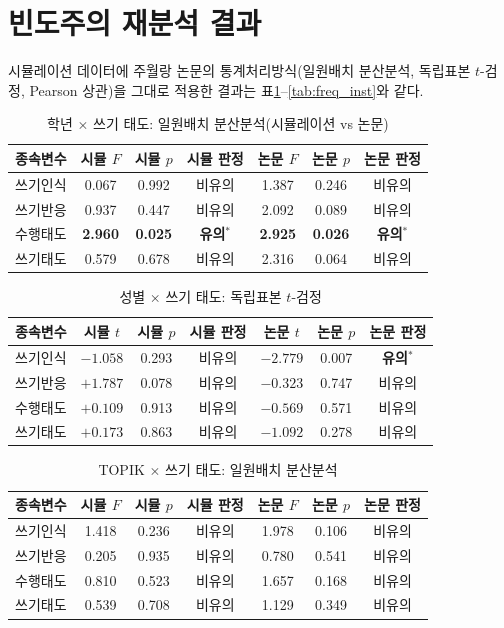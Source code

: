 \documentclass[11pt]{article}
\begin{document}
\section{빈도주의 재분석 결과}
\label{sec:freq}

시뮬레이션 데이터에 주월랑 논문의 통계처리방식(일원배치 분산분석, 독립표본 $t$-검정, Pearson 상관)을 그대로 적용한 결과는 표\ref{tab:freq_anova}--\ref{tab:freq_inst}와 같다.

\begin{table}[h]
\centering
\caption{학년 $\times$ 쓰기 태도: 일원배치 분산분석(시뮬레이션 vs 논문)}\label{tab:freq_anova}
\begin{tabular}{lcccccc}
\toprule
종속변수 & 시뮬 $F$ & 시뮬 $p$ & 시뮬 판정 & 논문 $F$ & 논문 $p$ & 논문 판정 \\
\midrule
쓰기인식 & 0.067 & 0.992 & 비유의 & 1.387 & 0.246 & 비유의 \\
쓰기반응 & 0.937 & 0.447 & 비유의 & 2.092 & 0.089 & 비유의 \\
수행태도 & \textbf{2.960} & \textbf{0.025} & \textbf{유의$^*$} & \textbf{2.925} & \textbf{0.026} & \textbf{유의$^*$} \\
쓰기태도 & 0.579 & 0.678 & 비유의 & 2.316 & 0.064 & 비유의 \\
\bottomrule
\end{tabular}
\end{table}

\begin{table}[h]
\centering
\caption{성별 $\times$ 쓰기 태도: 독립표본 $t$-검정}\label{tab:freq_tgender}
\begin{tabular}{lcccccc}
\toprule
종속변수 & 시뮬 $t$ & 시뮬 $p$ & 시뮬 판정 & 논문 $t$ & 논문 $p$ & 논문 판정 \\
\midrule
쓰기인식 & $-1.058$ & 0.293 & 비유의 & $-2.779$ & 0.007 & \textbf{유의$^*$} \\
쓰기반응 & $+1.787$ & 0.078 & 비유의 & $-0.323$ & 0.747 & 비유의 \\
수행태도 & $+0.109$ & 0.913 & 비유의 & $-0.569$ & 0.571 & 비유의 \\
쓰기태도 & $+0.173$ & 0.863 & 비유의 & $-1.092$ & 0.278 & 비유의 \\
\bottomrule
\end{tabular}
\end{table}

\begin{table}[h]
\centering
\caption{TOPIK $\times$ 쓰기 태도: 일원배치 분산분석}\label{tab:freq_topik}
\begin{tabular}{lcccccc}
\toprule
종속변수 & 시뮬 $F$ & 시뮬 $p$ & 시뮬 판정 & 논문 $F$ & 논문 $p$ & 논문 판정 \\
\midrule
쓰기인식 & 1.418 & 0.236 & 비유의 & 1.978 & 0.106 & 비유의 \\
쓰기반응 & 0.205 & 0.935 & 비유의 & 0.780 & 0.541 & 비유의 \\
수행태도 & 0.810 & 0.523 & 비유의 & 1.657 & 0.168 & 비유의 \\
쓰기태도 & 0.539 & 0.708 & 비유의 & 1.129 & 0.349 & 비유의 \\
\bottomrule
\end{tabular}
\end{table}
\end{document}
